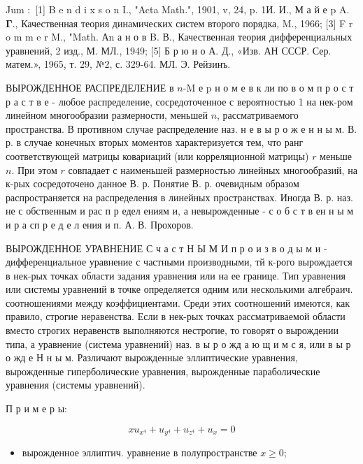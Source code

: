 \documentclass[10pt]{article}
\begin{document}
Jum $:$ [1] B e n d i x s o n I., "Acta Math.", 1901, v, 24, p. 1И. И., М а й е p A. $\boldsymbol{\Gamma}$., Качественная теория динамических систем второго порядка, M., 1966; [3] F r o m m e r M., "Math. Аn а н о в B. В., Качественная теория дифференциальных уравнений, 2 изд., М. МЛ., 1949; [5] Б р ю н о А. Д., «Изв. АН СССР. Сер. матем.», 1965, т. 29, №2, с. 329-64. МЛ. Э. Рейзинъ.



ВЫРОЖДЕННОЕ РАСПРЕДЕЛЕНИЕ в $n$-M е p н о м е в к ли по в о м п р о с т р а с т в е - любое распределение, сосредоточенное с вероятностью 1 на нек-ром линейном многообразии размерности, меньшей $n$, рассматриваемого пространства. В противном случае распределение наз. н е в ы р о ж е н н ы м. В. р. в случае конечных вторых моментов характеризуется тем, что ранг соответствующей матрицы ковариаций (или корреляционной матрицы) $r$ меньше $n$. При этом $r$ совпадает с наименьшей размерностью линейных многообразий, на к-рых сосредоточено данное В. р. Понятие В. р. очевидным образом распространяется на распределения в линейных пространствах. Иногда В. р. наз. не с обственным и рас п р едел ениям и, а невырожденные - с о б с т в ен н ы м и р а сп р е д е л ения и п. А. В. Прохоров.



ВЫРОЖДЕННОЕ УРАВНЕНИЕ С ч а с т Н Ы М И п р о и з в о д ы м и - дифференциальное уравнение с частными производными, тй к-рого вырождается в нек-рых точках области задания уравнения или на ее границе. Тип уравнения или системы уравнений в точке определяется одним или несколькими алгебраич. соотношениями между коэффициентами. Среди этих соотношений имеются, как правило, строгие неравенства. Если в нек-рых точках рассматриваемой области вместо строгих неравенств выполняются нестрогие, то говорят о вырождении типа, а уравнение (система уравнений) наз. в ы р о жд а ю щ и м с я, или в ы р о жд е Н н ы м. Различают вырожденные эллиптические уравнения, вырожденные гиперболические уравнения, вырожденные параболические уравнения (системы уравнений).



П р и м е р ы:



\[

x u_{x^{4}}+u_{y^{4}}+u_{z^{4}}+u_{x}=0

\]



\begin{itemize}

  \item вырожденное эллиптич. уравнение в полупространстве $x \geqslant 0$;

\end{itemize}
\end{document}
